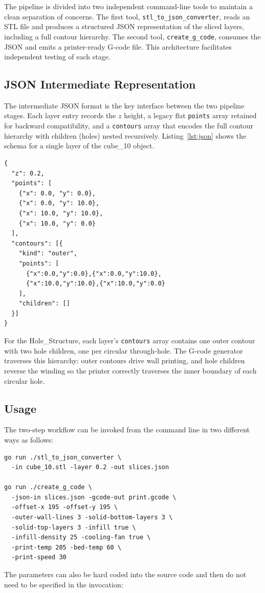 \documentclass[10pt,twocolumn,a4paper]{article}
\begin{document}
The pipeline is divided into two independent command-line tools
to maintain a clean separation of concerns.
The first tool, \texttt{stl\_to\_json\_converter}, reads an
STL file and produces a structured JSON representation of the
sliced layers, including a full contour hierarchy.
The second tool, \texttt{create\_g\_code}, consumes the JSON
and emits a printer-ready G-code file.
This architecture facilitates independent testing of each stage.

\subsection{JSON Intermediate Representation}

The intermediate JSON format is the key interface between the
two pipeline stages. Each layer entry records the $z$ height,
a legacy flat \texttt{points} array retained for backward
compatibility, and a \texttt{contours} array that encodes the
full contour hierarchy with children (holes) nested recursively.
Listing~\ref{lst:json} shows the schema for a single layer
of the cube\_10 object.
\newpage
\begin{lstlisting}[caption={JSON intermediate format: one layer
                   of cube\_10 (4-point outer contour, no holes).},
                   label={lst:json}, language={}]
{
  "z": 0.2,
  "points": [
    {"x": 0.0, "y": 0.0},
    {"x": 0.0, "y": 10.0},
    {"x": 10.0, "y": 10.0},
    {"x": 10.0, "y": 0.0}
  ],
  "contours": [{
    "kind": "outer",
    "points": [
      {"x":0.0,"y":0.0},{"x":0.0,"y":10.0},
      {"x":10.0,"y":10.0},{"x":10.0,"y":0.0}
    ],
    "children": []
  }]
}
\end{lstlisting}

For the Hole\_Structure, each layer's \texttt{contours} array
contains one outer contour with two hole children, one per
circular through-hole.
The G-code generator traverses this hierarchy: outer contours
drive wall printing, and hole children reverse the winding
so the printer correctly traverses the inner boundary of each
circular hole.

\subsection{Usage}

The two-step workflow can be invoked from the command line in two different ways as follows:

\begin{lstlisting}[caption={Two-step CLI workflow with included parameters.},
                   label={lst:workflow}, language={}]
go run ./stl_to_json_converter \
  -in cube_10.stl -layer 0.2 -out slices.json

go run ./create_g_code \
  -json-in slices.json -gcode-out print.gcode \
  -offset-x 195 -offset-y 195 \
  -outer-wall-lines 3 -solid-bottom-layers 3 \
  -solid-top-layers 3 -infill true \
  -infill-density 25 -cooling-fan true \
  -print-temp 205 -bed-temp 60 \
  -print-speed 30
\end{lstlisting}
The parameters can also be hard coded into the source code and then do not need to be specified in the invocation:
\end{document}
